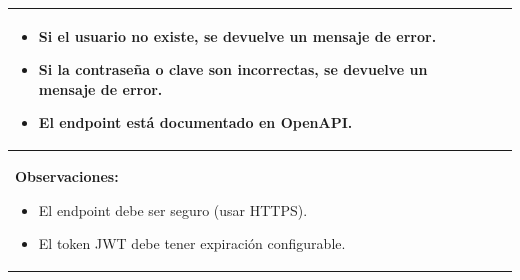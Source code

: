 \begin{table}[H]
\begin{center}
\begin{tabularx}{\textwidth}{|l|X|l|}
{\begin{itemize}
                        \item Si el usuario no existe, se devuelve un mensaje de error.
                        \item Si la contraseña o clave son incorrectas, se devuelve un mensaje de error.
                        \item El endpoint está documentado en OpenAPI.
                    \end{itemize}
            }\\
            \hline
            \multicolumn{3}{|p{\textwidth}|}{
                \textbf{Observaciones:}
                \begin{itemize}
                    \item El endpoint debe ser seguro (usar HTTPS).
                    \item El token JWT debe tener expiración configurable.
                \end{itemize}
            }\\
            \hline
        \end{tabularx}
    \end{center}
\end{table}

